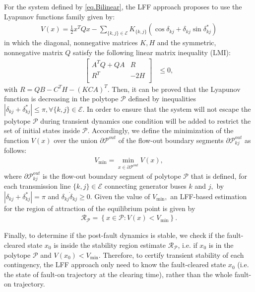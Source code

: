 \documentclass[final]{IEEEtran}
\begin{document}
For the system defined by \eqref{eq.Bilinear}, the LFF approach
proposes to use the Lyapunov functions family  given by:
\begin{align} \label{eq.Lyapunov}
V(x) = \frac{1}{2}x^T Q x - \sum_{\{k,j\}\in \mathcal{E}}
K_{\{k,j\}} \left(\cos\delta_{kj}
+\delta_{kj}\sin\delta_{kj}^*\right)
\end{align}
in which  the diagonal, nonnegative matrices $K, H$  and the
symmetric, nonnegative matrix $Q$ satisfy the following linear
matrix inequality (LMI):
\begin{align}
\label{eq.QKH}
    \left[   \begin{array}{ccccc}
          A^TQ+QA  & R \\
          R^T  & -2H\\
        \end{array}\right] &\le 0,
\end{align}
with $R = QB-C^TH-(KCA)^T$. Then, it can be proved that the
Lyapunov function is decreasing in the polytope $\mathcal{P}$
defined by inequalities $|\delta_{kj}+\delta_{kj}^*| \le \pi,
\forall \{k,j\} \in \mathcal{E}.$ In order to ensure that the
system will not escape the polytope $\mathcal{P}$ during transient
dynamics one condition will be added to restrict the set of
initial states inside $\mathcal{P}.$ Accordingly, we define the
minimization of the function $V(x)$ over the union
$\partial\mathcal{P}^{out}$ of the flow-out boundary segments
$\partial\mathcal{P}_{kj}^{out}$ as follows:
\begin{align}\label{eq.Vmin1}
 V_{\min}=\mathop {\min}\limits_{x \in \partial\mathcal{P}^{out}} V(x),
\end{align}
where $\partial\mathcal{P}_{kj}^{out}$ is the flow-out boundary
segment of polytope $\mathcal{P}$ that is defined, for each
transmission line $\{k,j\}\in \mathcal{E}$ connecting generator
buses $k$ and $j,$ by $|\delta_{kj} +\delta_{kj}^*| = \pi$ and
$\delta_{kj}\dot{\delta}_{kj} \ge 0$. Given the value of
$V_{\min},$ an LFF-based estimation for the region of attraction
of the equilibrium point is given by
\begin{align}\label{eq.invariant}
 \mathcal{R_P} = \left\{x \in\mathcal{P}: V(x) < V_{\min}\right\}.
\end{align}


Finally, to determine if the post-fault dynamics is stable, we
check if the fault-cleared state $x_0$  is inside the stability
region estimate $\mathcal{R_P}$, i.e. if $x_0$ is in the polytope
$\mathcal{P}$ and $V(x_0) < V_{\min}.$ Therefore, to certify
transient stability of each contingency, the LFF approach only
need to know the fault-cleared state $x_0$ (i.e. the state of
fault-on trajectory at the clearing time), rather than the whole
fault-on trajectory.
\end{document}
